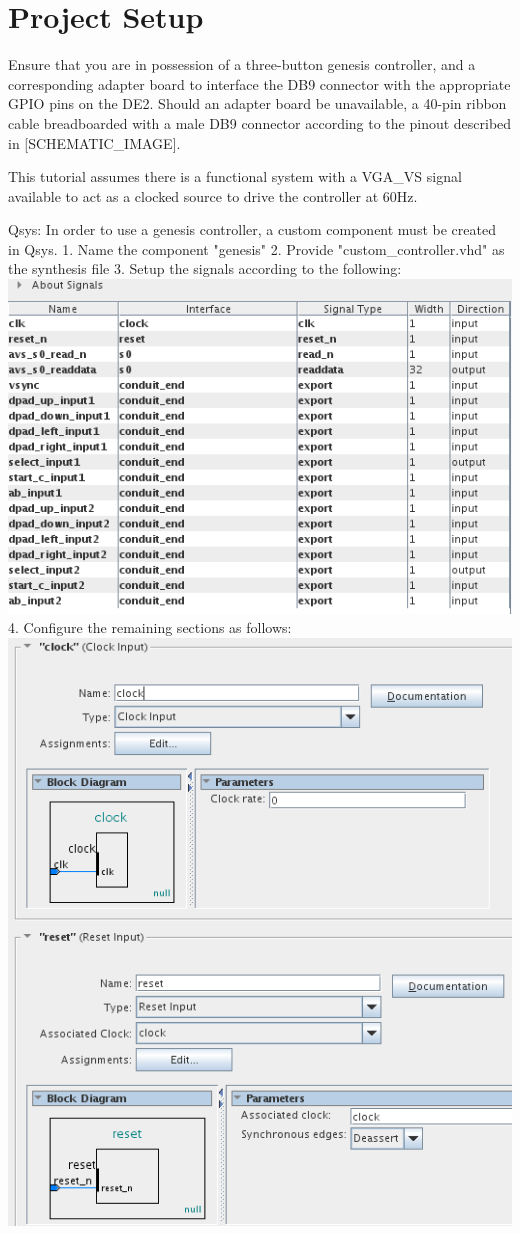 \documentclass{capstonedoc}
\begin{document}
\section{Project Setup}
Ensure that you are in possession of a three-button genesis controller, and a 
corresponding adapter board to interface the DB9 connector with the appropriate 
GPIO pins on the DE2. Should an adapter board be unavailable, a 40-pin ribbon 
cable breadboarded with a male DB9 connector according to the pinout described 
in [SCHEMATIC_IMAGE]. 

This tutorial assumes there is a functional system with a VGA_VS signal available 
to act as a clocked source to drive the controller at 60Hz. 

Qsys:
In order to use a genesis controller, a custom component must be created in Qsys.
1. Name the component "genesis"
2. Provide "custom_controller.vhd" as the synthesis file
3. Setup the signals according to the following:
\includegraphics{fig1}
4. Configure the remaining sections as follows:
\includegraphics{fig2}
\end{document}
